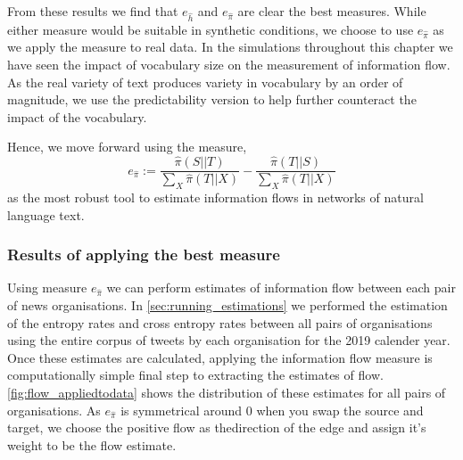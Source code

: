 From these results we find that $e_{\hat{h}}$ and $e_{\hat{\pi}}$ are clear the best measures. While either measure would be suitable in synthetic conditions, we choose to use $e_{\hat{\pi}}$ as we apply the measure to real data. In the simulations throughout this chapter we have seen the impact of vocabulary size on the measurement of information flow. As the real variety of text produces variety in vocabulary by an order of magnitude, we use the predictability version to help further counteract the impact of the vocabulary. 

Hence, we move forward using the measure,
\begin{equation} 
e_{\hat{\pi}} := \frac{\hat{\pi}(S||T)}{\sum_X \hat{\pi}(T||X)} - \frac{\hat{\pi}(T||S)}{\sum_X \hat{\pi}(T||X)}
\end{equation}
as the most robust tool to estimate information flows in networks of natural language text. 

\subsubsection{Results of applying the best measure}

Using measure $e_{\hat{\pi}}$ we can perform estimates of information flow between each pair of news organisations. In \autoref{sec:running_estimations} we performed the estimation of the entropy rates and cross entropy rates between all pairs of organisations using the entire corpus of tweets by each organisation for the 2019 calender year. Once these estimates are calculated, applying the information flow measure is computationally simple final step to extracting the estimates of flow. \autoref{fig:flow_appliedtodata} shows the distribution of these estimates for all pairs of organisations. As $e_{\hat{\pi}}$ is symmetrical around 0 when you swap the source and target, we choose the positive flow as thedirection of the edge and assign it's weight to be the flow estimate.

